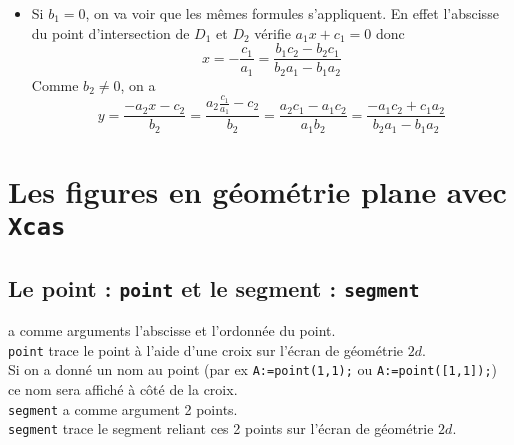 \documentclass[12pt,a4paper]{book}
\begin{document}
\begin{giacjshere}
\begin{itemize}
On remplace dans l'expression de $y$ en fonction de $x$ :
$$y=\frac{1}{b_1}(-a_1\frac{b_1c_2-b_2c_1}{b_2a_1-b_1a_2}-c_1)=\frac{1}{b_1}(\frac{-a_1b_1c_2+a_1b_2c_1-c_1(b_2a_1-b_1a_2)}{b_2a_1-b_1a_2})$$
Donc
$$y=\frac{-a_1b_1c_2+c_1b_1a_2}{b_1(b_2a_1-b_1a_2)}=\frac{-a_1c_2+c_1a_2}{b_2a_1-b_1a_2}$$
\item
Si $ b_1=0$, on va voir que les m\^emes formules s'appliquent.
En effet l'abscisse du point d'intersection de 
$D_1$ et $D_2$ v\'erifie $a_1x+c_1=0$  donc 
$$x=-\frac{c_1}{a_1}=\frac{b_1c_2-b_2c_1}{b_2a_1-b_1a_2}$$
Comme $b_2\neq0$, on a 
$$y=\frac{-a_2x-c_2}{b_2}=\frac{a_2\frac{c_1}{a_1}-c_2}{b_2}=\frac{a_2 c_1-a_1 c_2}{a_1b_2}=\frac{-a_1c_2+c_1a_2}{b_2a_1-b_1a_2}$$
\end{itemize}


\chapter{Les figures en g\'eom\'etrie plane avec {\tt Xcas}}
\section{Le point : {\tt point} et le segment : {\tt segment}}
 a comme arguments l'abscisse et l'ordonn\'ee du point.\\
{\tt point} trace le point \`a l'aide d'une croix sur l'\'ecran de 
g\'eom\'etrie $2d$.\\
Si on a donn\'e un nom au point (par ex {\tt A:=point(1,1);} ou 
{\tt A:=point([1,1]);}) ce nom sera affich\'e \`a c\^ot\'e de la croix.\\
{\tt segment} a comme argument 2 points.\\
{\tt segment} trace le segment reliant ces 2 points sur l'\'ecran de 
g\'eom\'etrie $2d$.\\

\end{giacjshere}
\end{document}
